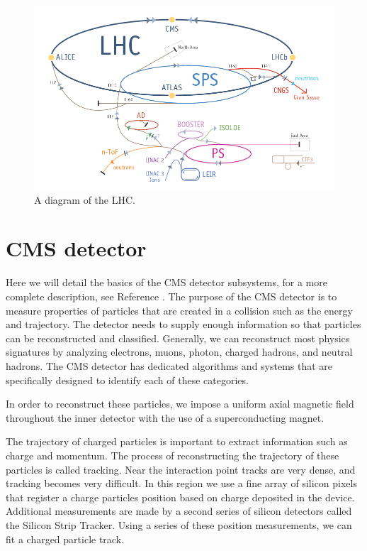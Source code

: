 \begin{figure}
\begin{center}
\includegraphics[width=1.0\linewidth]{figs/lhc.png}
\caption{A diagram of the LHC.}
\label{figs:lhc}
\end{center}
\end{figure}

\section{CMS detector}
Here we will detail the basics of the CMS detector subsystems, for a more complete description, see Reference \cite{Bayatian:922757}.
The purpose of the CMS detector is to measure properties of particles that are created in a collision such as the energy and trajectory. 
The detector needs to supply enough information so that particles can be reconstructed and classified.  
Generally, we can reconstruct most physics signatures by analyzing electrons, muons, photon, charged hadrons, and neutral hadrons. 
The CMS detector has dedicated algorithms and systems that are specifically designed to identify each of these categories.  

In order to reconstruct these particles, we impose a uniform axial magnetic field throughout the inner detector with the use of a superconducting magnet. 

The trajectory of charged particles is important to extract information such as charge and momentum.  
The process of reconstructing the trajectory of these  particles is called tracking.  
Near the interaction point tracks are very dense, and tracking becomes very difficult.  
In this region we use a fine array of silicon pixels that register a charge particles position based on charge deposited in the device.  
Additional measurements are made by a second series of silicon detectors called the Silicon Strip Tracker. 
Using a series of these position measurements, we can fit a charged particle track.  

